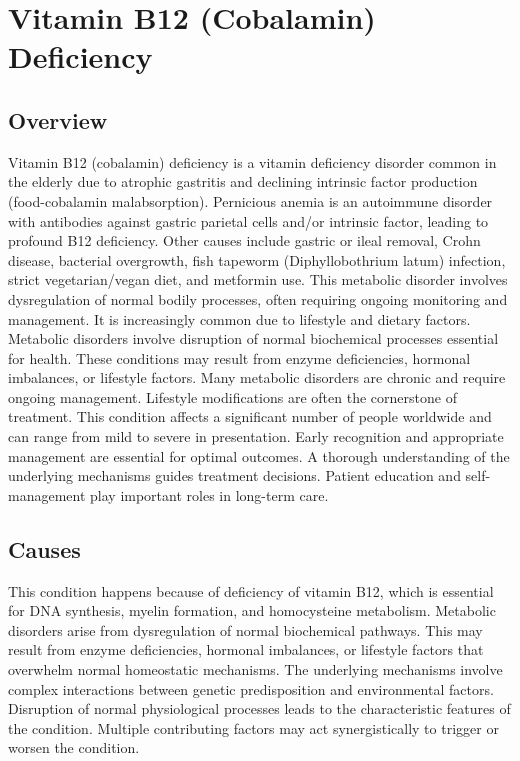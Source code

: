 \chapter{Vitamin B12 (Cobalamin) Deficiency}
\label{sec:Vitamin B12 Deficiency}

\section{Overview}
Vitamin B12 (cobalamin) deficiency is a vitamin deficiency disorder common in the elderly due to atrophic gastritis and declining intrinsic factor production (food-cobalamin malabsorption). Pernicious anemia is an autoimmune disorder with antibodies against gastric parietal cells and/or intrinsic factor, leading to profound B12 deficiency. Other causes include gastric or ileal removal, Crohn disease, bacterial overgrowth, fish tapeworm (Diphyllobothrium latum) infection, strict vegetarian/vegan diet, and metformin use. This metabolic disorder involves dysregulation of normal bodily processes, often requiring ongoing monitoring and management. It is increasingly common due to lifestyle and dietary factors. Metabolic disorders involve disruption of normal biochemical processes essential for health. These conditions may result from enzyme deficiencies, hormonal imbalances, or lifestyle factors. Many metabolic disorders are chronic and require ongoing management. Lifestyle modifications are often the cornerstone of treatment. This condition affects a significant number of people worldwide and can range from mild to severe in presentation. Early recognition and appropriate management are essential for optimal outcomes. A thorough understanding of the underlying mechanisms guides treatment decisions. Patient education and self-management play important roles in long-term care.
\section{Causes}
This condition happens because of deficiency of vitamin B12, which is essential for DNA synthesis, myelin formation, and homocysteine metabolism. Metabolic disorders arise from dysregulation of normal biochemical pathways. This may result from enzyme deficiencies, hormonal imbalances, or lifestyle factors that overwhelm normal homeostatic mechanisms. The underlying mechanisms involve complex interactions between genetic predisposition and environmental factors. Disruption of normal physiological processes leads to the characteristic features of the condition. Multiple contributing factors may act synergistically to trigger or worsen the condition.
